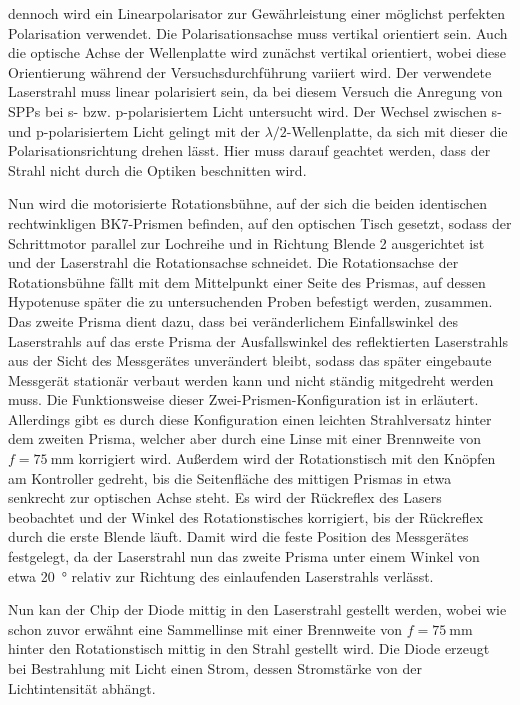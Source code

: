 dennoch wird ein Linearpolarisator zur Gewährleistung einer möglichst perfekten Polarisation verwendet. Die Polarisationsachse muss vertikal orientiert sein.
Auch die optische Achse der Wellenplatte wird zunächst vertikal orientiert, wobei diese Orientierung während der Versuchsdurchführung variiert wird. Der
verwendete Laserstrahl muss linear polarisiert sein, da bei diesem Versuch die Anregung von SPPs bei s- bzw. p-polarisiertem Licht untersucht wird. Der Wechsel
zwischen s- und p-polarisiertem Licht gelingt mit der $\lambda/2$-Wellenplatte, da sich mit dieser die Polarisationsrichtung drehen lässt. Hier muss darauf geachtet werden,
dass der Strahl nicht durch die Optiken beschnitten wird.\par
Nun wird die motorisierte Rotationsbühne, auf der sich die beiden identischen rechtwinkligen BK7-Prismen befinden, auf den optischen Tisch gesetzt, sodass der
Schrittmotor parallel zur Lochreihe und in Richtung Blende 2 ausgerichtet ist und der Laserstrahl die Rotationsachse schneidet. Die Rotationsachse der Rotationsbühne fällt
mit dem Mittelpunkt einer Seite des Prismas, auf dessen Hypotenuse später die zu untersuchenden Proben befestigt werden, zusammen. Das zweite Prisma dient dazu,
dass bei veränderlichem Einfallswinkel des Laserstrahls auf das erste Prisma der Ausfallswinkel des reflektierten Laserstrahls aus der Sicht des Messgerätes unverändert bleibt,
sodass das später eingebaute Messgerät stationär verbaut werden kann und nicht ständig mitgedreht werden muss. Die Funktionsweise dieser Zwei-Prismen-Konfiguration
ist in \cite{prism} erläutert. Allerdings gibt es durch diese Konfiguration einen leichten Strahlversatz hinter dem zweiten Prisma, welcher aber durch eine Linse
mit einer Brennweite von $f = \SI{75}{\mm}$ korrigiert wird. Außerdem wird der Rotationstisch mit den Knöpfen am Kontroller gedreht, bis die Seitenfläche des mittigen Prismas
in etwa senkrecht zur optischen Achse steht. Es wird der Rückreflex des Lasers beobachtet und der Winkel des Rotationstisches korrigiert, bis der Rückreflex durch
die erste Blende läuft. Damit wird die feste Position des Messgerätes festgelegt, da der Laserstrahl nun das zweite Prisma unter einem Winkel von etwa \SI{20}{\degree}
relativ zur Richtung des einlaufenden Laserstrahls verlässt.\par
Nun kan der Chip der Diode mittig in den Laserstrahl gestellt werden, wobei wie schon zuvor erwähnt eine Sammellinse mit einer Brennweite von $f = \SI{75}{\mm}$ hinter
den Rotationstisch mittig in den Strahl gestellt wird. Die Diode erzeugt bei Bestrahlung mit Licht einen Strom, dessen Stromstärke von der Lichtintensität abhängt.
